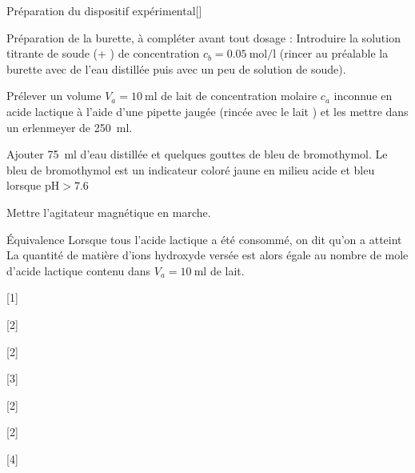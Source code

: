 \begin{doc}{Préparation du dispositif expérimental}[\label{doc:preparation}]
  \begin{protocole}
    \item Préparation de la burette, à compléter avant tout dosage :
    Introduire la solution titrante de soude (\ionSodium + \hydroxyde) de concentration $c_b = \qty{0,05}{\mol\per\litre}$ (rincer au préalable la burette avec de l’eau distillée puis avec un peu de solution de soude).
    \item Prélever un volume $V_a = \qty{10}{\ml}$ de lait de concentration molaire $c_a$ inconnue en acide lactique à l’aide d’une pipette jaugée (rincée avec le lait ) et les mettre dans un erlenmeyer de \qty{250}{\ml}.
    \item Ajouter \qty{75}{\ml} d’eau distillée et quelques gouttes
    de bleu de bromothymol. Le bleu de bromothymol est un indicateur coloré jaune en milieu acide et bleu lorsque $\text{pH} > \num{7,6}$
    \item Mettre l’agitateur magnétique en marche.
  \end{protocole}
\end{doc}


\begin{doc}{Équivalence}
  Lorsque tous l'acide lactique a été consommé, on dit qu'on a atteint 
  La quantité de matière d’ions hydroxyde \hydroxyde versée est alors égale au nombre de mole
  d’acide lactique contenu dans $V_a = \qty{10}{\ml}$ de lait.
\end{doc}

[1]

[2]

[2]

[3]

[2]

[2]

[4]